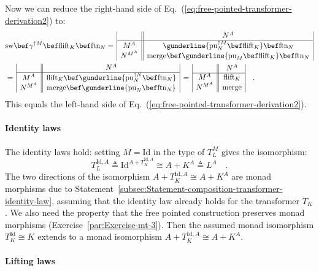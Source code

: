 Now we can reduce the right-hand side of Eq.~(\ref{eq:free-pointed-transformer-derivation2})
to:
\begin{align*}
 & \text{sw}\bef\gamma^{\uparrow M}\bef\text{flift}_{K}\bef\text{ftn}_{N}=\,\begin{array}{|c||c|}
 & N^{A}\\
\hline M^{A} & \gunderline{\text{pu}_{N}^{\uparrow M}\bef\text{flift}_{K}}\bef\text{ftn}_{N}\\
N^{M^{A}} & \text{merge}\bef\gunderline{\text{pu}_{M}\bef\text{flift}_{K}}\bef\text{ftn}_{N}
\end{array}\\
 & =\,\begin{array}{|c||c|}
 & N^{A}\\
\hline M^{A} & \text{flift}_{K}\bef\gunderline{\text{pu}_{N}^{\uparrow N}\bef\text{ftn}_{N}}\\
N^{M^{A}} & \text{merge}\bef\gunderline{\text{pu}_{N}\bef\text{ftn}_{N}}
\end{array}\,=\,\begin{array}{|c||c|}
 & N^{A}\\
\hline M^{A} & \text{flift}_{K}\\
N^{M^{A}} & \text{merge}
\end{array}\quad.
\end{align*}
This equals the left-hand side of Eq.~(\ref{eq:free-pointed-transformer-derivation2}).

\paragraph{Identity laws}

The identity laws hold: setting $M=\text{Id}$ in the type of $T_{L}^{M}$
gives the isomorphism:
\[
T_{L}^{\text{Id},A}\triangleq\text{Id}^{A+T_{K}^{\text{Id},A}}\cong A+K^{A}\triangleq L^{A}\quad.
\]
The two directions of the isomorphism $A+T_{K}^{\text{Id},A}\cong A+K^{A}$
are monad morphisms due to Statement~\ref{subsec:Statement-composition-transformer-identity-law},
assuming that the identity law already holds for the transformer $T_{K}$.
We also need the property that the free pointed construction preserves
monad morphisms (Exercise~\ref{par:Exercise-mt-3}). Then the assumed
monad isomorphism $T_{K}^{\text{Id}}\cong K$ extends to a monad isomorphism
$A+T_{K}^{\text{Id},A}\cong A+K^{A}$.

\paragraph{Lifting laws}

